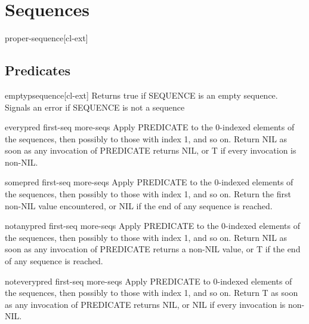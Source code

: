 \documentclass[10pt,english]{book}
\begin{document}
\chapter{Sequences}
\label{cha:sequences}

\begin{type}{proper-sequence}{}[cl-ext]
  
\end{type}

\section{Predicates}
\label{sec:sequence-predicates}

\begin{function}{emptyp}{sequence}[cl-ext]
  Returns true if SEQUENCE is an empty sequence. Signals an error if
  SEQUENCE is not a sequence
\end{function}

\begin{function}{every}{pred first-seq \rest more-seqs}
  Apply PREDICATE to the 0-indexed elements of the sequences, then
  possibly to those with index 1, and so on. Return NIL as soon
  as any invocation of PREDICATE returns NIL, or T if every invocation
  is non-NIL.
\end{function}

\begin{function}{some}{pred first-seq \rest more-seqs}
  Apply PREDICATE to the 0-indexed elements of the sequences, then
  possibly to those with index 1, and so on. Return the first
  non-NIL value encountered, or NIL if the end of any sequence is reached.
\end{function}

\begin{function}{notany}{pred first-seq \rest more-seqs}
  Apply PREDICATE to the 0-indexed elements of the sequences, then
  possibly to those with index 1, and so on. Return NIL as soon
  as any invocation of PREDICATE returns a non-NIL value, or T if the end
  of any sequence is reached.
\end{function}

\begin{function}{notevery}{pred first-seq \rest more-seqs}
  Apply PREDICATE to 0-indexed elements of the sequences, then
  possibly to those with index 1, and so on. Return T as soon
  as any invocation of PREDICATE returns NIL, or NIL if every invocation
  is non-NIL.
\end{function}
\end{document}
